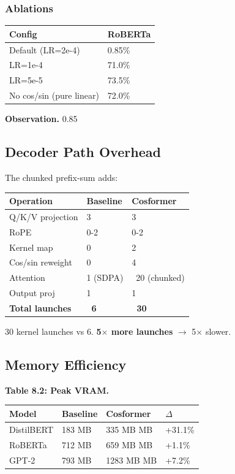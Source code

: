 \subsubsection{Ablations}

\begin{table}[H]
\centering
\small
\begin{tabular}{ll}
\toprule
\textbf{Config} & \textbf{RoBERTa} \\
\midrule
Default (LR=2e-4) & 0.85\% \\
LR=1e-4 & 71.0\% \\
LR=5e-5 & 73.5\% \\
No cos/sin (pure linear) & 72.0\% \\
\bottomrule
\end{tabular}
\end{table}

\textbf{Observation.} 0.85

\subsection{Decoder Path Overhead}

The chunked prefix-sum adds:

\begin{table}[H]
\centering
\small
\begin{tabular}{lll}
\toprule
\textbf{Operation} & \textbf{Baseline} & \textbf{Cosformer} \\
\midrule
Q/K/V projection & 3 & 3 \\
RoPE & 0-2 & 0-2 \\
Kernel map & 0 & 2 \\
Cos/sin reweight & 0 & 4 \\
Attention & 1 (SDPA) & ~20 (chunked) \\
Output proj & 1 & 1 \\
\textbf{Total launches} & \textbf{~6} & \textbf{~30} \\
\bottomrule
\end{tabular}
\end{table}

30 kernel launches vs 6. \textbf{5$\times$ more launches} $\to$ 5$\times$ slower.

\subsection{Memory Efficiency}

\textbf{Table 8.2: Peak VRAM.}

\begin{table}[H]
\centering
\small
\begin{tabular}{llll}
\toprule
\textbf{Model} & \textbf{Baseline} & \textbf{Cosformer} & \textbf{$\Delta$} \\
\midrule
DistilBERT & 183 MB & 335 MB MB & +31.1\% \\
RoBERTa & 712 MB & 659 MB MB & +1.1\% \\
GPT-2 & 793 MB & 1283 MB MB & +7.2\% \\
\bottomrule
\end{tabular}
\end{table}

